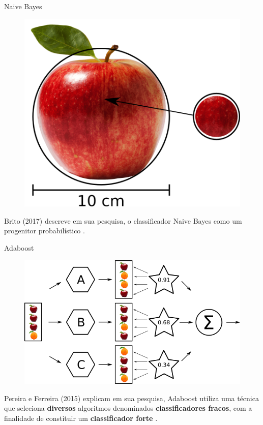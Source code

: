   \begin{frame}[fragile]{Naive Bayes}
    \begin{figure}[H]
        \begin{center}
            \includegraphics[scale=0.50]{images/naive_bayes.png}
        \end{center}
    \end{figure}
    Brito (2017) descreve em sua pesquisa, o classificador Naive Bayes como
    um progenitor probabilístico \cite{de2017mineraccao}.
  \end{frame}

  \begin{frame}[fragile]{Adaboost}
    \begin{figure}[H]
        \begin{center}
            \includegraphics[scale=0.50]{images/adaboost.png}
        \end{center}
    \end{figure}

    Pereira e Ferreira (2015) explicam em sua pesquisa, Adaboost utiliza uma
    técnica que seleciona \textbf{diversos} algoritmos denominados 
    \textbf{classificadores fracos}, com a finalidade de constituir um 
    \textbf{classificador forte} \cite{pereiraface}.
  \end{frame}

